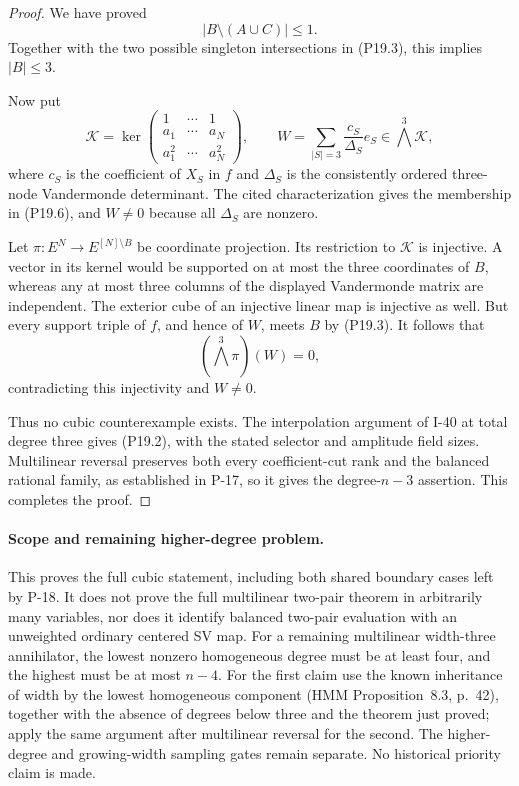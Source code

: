 \begin{proof}
We have proved
\[
 |B\setminus(A\cup C)|\le1.
 \tag{P19.5}
\]
Together with the two possible singleton intersections in
(P19.3), this implies $|B|\le3$.

Now put
\[
 \mathscr K=\ker
 \begin{pmatrix}
 1&\cdots&1\\ a_1&\cdots&a_N\\ a_1^2&\cdots&a_N^2
 \end{pmatrix},
 \qquad
 W=\sum_{|S|=3}\frac{c_S}{\Delta_S}e_S
       \in\bigwedge^3\mathscr K,
 \tag{P19.6}
\]
where $c_S$ is the coefficient of $X_S$ in $f$ and
$\Delta_S$ is the consistently ordered three-node Vandermonde
determinant. The cited characterization gives the membership
in (P19.6), and $W\ne0$ because all $\Delta_S$ are nonzero.

Let $\pi:E^N\to E^{[N]\setminus B}$ be coordinate projection.
Its restriction to $\mathscr K$ is injective. A vector in its
kernel would be supported on at most the three coordinates
of $B$, whereas any at most three columns of the displayed
Vandermonde matrix are independent. The exterior cube of an
injective linear map is injective as well. But every support
triple of $f$, and hence of $W$, meets $B$ by (P19.3).
It follows that
\[
 (\bigwedge^3\pi)(W)=0,
 \tag{P19.7}
\]
contradicting this injectivity and $W\ne0$.

Thus no cubic counterexample exists. The interpolation
argument of I-40 at total degree three gives (P19.2), with
the stated selector and amplitude field sizes. Multilinear
reversal preserves both every coefficient-cut rank and the
balanced rational family, as established in P-17, so it gives
the degree-$n-3$ assertion. This completes the proof.
\end{proof}

\paragraph{Scope and remaining higher-degree problem.}
This proves the full cubic statement, including both shared
boundary cases left by P-18. It does not prove the full
multilinear two-pair theorem in arbitrarily many variables,
nor does it identify balanced two-pair evaluation with an
unweighted ordinary centered SV map. For a remaining
multilinear width-three annihilator, the lowest nonzero
homogeneous degree must be at least four, and the highest
must be at most $n-4$. For the first claim use the known
inheritance of width by the lowest homogeneous component
(HMM Proposition~8.3, p.~42), together with the absence of
degrees below three and the theorem just proved; apply the
same argument after multilinear reversal for the second.
The higher-degree and growing-width sampling gates remain
separate. No historical priority claim is made.

